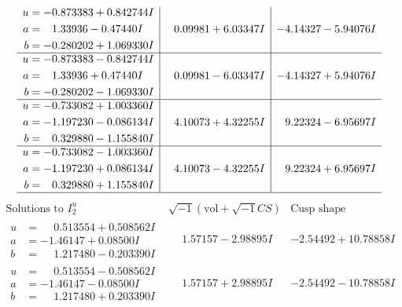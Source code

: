 \documentclass[1p]{elsarticle_modified}
\theoremstyle{definition}
\newcommand{\I}{\sqrt{-1}}
\begin{document}
$$\begin{array}{c|c|c}
\begin{aligned}
u &= -0.873383 + 0.842744 I \\
a &= \phantom{-}1.33936 - 0.47440 I \\
b &= -0.280202 + 1.069330 I\end{aligned}
 & \phantom{-}0.09981 + 6.03347 I & -4.14327 - 5.94076 I \\ \hline\begin{aligned}
u &= -0.873383 - 0.842744 I \\
a &= \phantom{-}1.33936 + 0.47440 I \\
b &= -0.280202 - 1.069330 I\end{aligned}
 & \phantom{-}0.09981 - 6.03347 I & -4.14327 + 5.94076 I \\ \hline\begin{aligned}
u &= -0.733082 + 1.003360 I \\
a &= -1.197230 - 0.086134 I \\
b &= \phantom{-}0.329880 - 1.155840 I\end{aligned}
 & \phantom{-}4.10073 + 4.32255 I & \phantom{-}9.22324 - 6.95697 I \\ \hline\begin{aligned}
u &= -0.733082 - 1.003360 I \\
a &= -1.197230 + 0.086134 I \\
b &= \phantom{-}0.329880 + 1.155840 I\end{aligned}
 & \phantom{-}4.10073 - 4.32255 I & \phantom{-}9.22324 + 6.95697 I\\
 \hline 
 \end{array}$$\newpage$$\begin{array}{c|c|c}  
\text{Solutions to }I^u_{2}& \I (\text{vol} + \sqrt{-1}CS) & \text{Cusp shape}\\
 \hline 
\begin{aligned}
u &= \phantom{-}0.513554 + 0.508562 I \\
a &= -1.46147 + 0.08500 I \\
b &= \phantom{-}1.217480 - 0.203390 I\end{aligned}
 & \phantom{-}1.57157 - 2.98895 I & -2.54492 + 10.78858 I \\ \hline\begin{aligned}
u &= \phantom{-}0.513554 - 0.508562 I \\
a &= -1.46147 - 0.08500 I \\
b &= \phantom{-}1.217480 + 0.203390 I\end{aligned}
 & \phantom{-}1.57157 + 2.98895 I & -2.54492 - 10.78858 I \\ \hline\begin{aligned}

\end{aligned}
\end{array}$$
\end{document}
